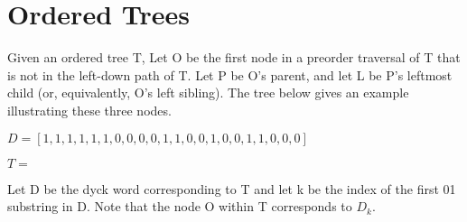 \documentclass{article}
\begin{document}
\section*{Ordered Trees}


Given an ordered tree T, Let O be the first node in a preorder traversal of T that is not in the left-down path of T. Let P be O's parent, and let L be P's leftmost child (or, equivalently, O's left sibling).  The tree below gives an example illustrating these three nodes. 

$D=[1, 1, 1, 1, 1, 1, 0, 0, 0, 0, 1, 1, 0, 0, 1, 0, 0, 1, 1, 0, 0, 0]$

$T=$


\noindent Let D be the dyck word corresponding to T and let k be the index of the first 01 substring in D. Note that the node O within T corresponds to $D_k$.
\end{document}

